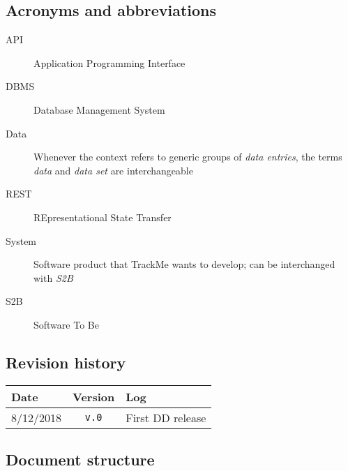 \documentclass[../DD0.tex]{subfiles}
\newcommand{\addRevision}[3]{#1 & \texttt{v.#2} & #3 \\ \hline}
\begin{document}
  \subsection{Acronyms and abbreviations}
  \label{sec:acronyms}

    \begin{description}
      \item[API] Application Programming Interface

      \item[DBMS] Database Management System

      \item[Data] Whenever the context refers to generic groups of \textit{data entries}, the terms \textit{data} and \textit{data set} are interchangeable

      \item[REST] REpresentational State Transfer

      \item[System] Software product that TrackMe wants to develop; can be interchanged with \textit{S2B}

      \item[S2B] Software To Be
    \end{description}

  \subsection{Revision history}
  \label{sec:revhistory}

    \begin{table}[!h]
      \begin{tabularx}{\linewidth}{|l|c|X|}
        \hline
        \textbf{Date} & \textbf{Version}  & \textbf{Log} \\ \hline
        \addRevision{8/12/2018}{0}{First DD release}
      \end{tabularx}
    \end{table}

  \subsection{Document structure}
  \label{sec:docstructure}
\end{document}
